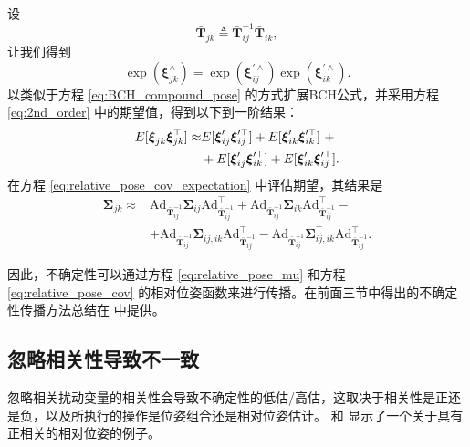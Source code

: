 设
\begin{equation}
    \bar{\mathbf{T}}_{jk} \triangleq \bar{\mathbf{T}}_{ij}^{-1} \bar{\mathbf{T}}_{ik}, \label{eq:relative_pose_mu}
\end{equation}
让我们得到
\begin{equation}
     \operatorname{exp}(\boldsymbol{\xi}_{jk}^\wedge) = \operatorname{exp}(\boldsymbol{\xi}_{ij}^{\prime\wedge})
    \operatorname{exp}(\boldsymbol{\xi}_{ik}^{\prime\wedge}).
\end{equation}
以类似于方程
\eqref{eq:BCH_compound_pose} 的方式扩展BCH公式，并采用方程 \eqref{eq:2nd_order} 中的期望值，得到以下到一阶结果： 
\begin{align}
    E[\xib{jk}\xibt{jk}] \approx &E [ \xip{ij}\xipt{ij} ] + E[\xip{ik}\xipt{ik}] ~+  \label{eq:relative_pose_cov_expectation}\\       
    &+E[\xip{ij}\xipt{ik}] + E[\xip{ik}\xipt{ij}]. \nonumber
\end{align} 
在方程 \eqref{eq:relative_pose_cov_expectation} 中评估期望，其结果是 
\begin{align}
    \boldsymbol{\Sigma}_{jk} \approx
    &\mathrm{Ad}_{\bar{\mathbf{T}}_{ij}^{-1}} \boldsymbol{\Sigma}_{ij} \mathrm{Ad}_{\bar{\mathbf{T}}_{ij}^{-1}}^\top +
    \mathrm{Ad}_{\bar{\mathbf{T}}_{ij}^{-1}} \boldsymbol{\Sigma}_{ik} \mathrm{Ad}_{\bar{\mathbf{T}}_{ij}^{-1}}^\top - \label{eq:relative_pose_cov}\\
    &+\mathrm{Ad}_{\bar{\mathbf{T}}_{ij}^{-1}} \boldsymbol{\Sigma}_{ij,ik} \mathrm{Ad}_{\bar{\mathbf{T}}_{ij}^{-1}}^\top -
    \mathrm{Ad}_{\bar{\mathbf{T}}_{ij}^{-1}} \boldsymbol{\Sigma}_{ij,ik}^\top \mathrm{Ad}_{\bar{\mathbf{T}}_{ij}^{-1}}^\top. \nonumber
\end{align}

因此，不确定性可以通过方程
\eqref{eq:relative_pose_mu} 和方程 \eqref{eq:relative_pose_cov} 的相对位姿函数来进行传播。在前面三节中得出的不确定性传播方法总结在  中提供。 

\subsection{忽略相关性导致不一致}

忽略相关扰动变量的相关性会导致不确定性的低估/高估，这取决于相关性是正还是负，以及所执行的操作是位姿组合还是相对位姿估计。 
 和  显示了一个关于具有正相关的相对位姿的例子。 

